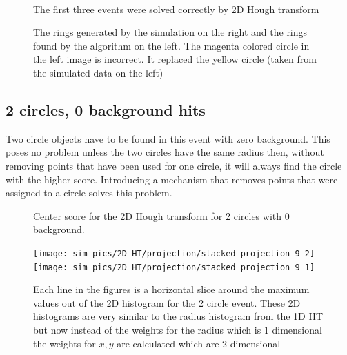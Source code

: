 \documentclass[11pt]{scrreprt}
\begin{document}
\begin{figure}[htp]
        \centering
        ~ %
        ~ %
              
        \caption{The first three events were solved correctly by 2D Hough transform}\label{fig:2D_HT_results1}

        \caption{The rings generated by the simulation on the right and the rings found by the algorithm on the left. The magenta 
        colored circle in the left image is incorrect. It replaced the yellow circle (taken from the simulated data on the left)}
        \label{fig:2d_6c_200_bg2}
\end{figure}


\subsection{2 circles, 0 background hits} %
\label{sub:2d_hough_transform_2_circles_0_background}
Two circle objects have to be found in this event with zero background. This
poses no problem unless the two circles have the same radius then, without
removing points that have been used for one circle, it will always find the 
circle with the higher score. Introducing a mechanism that removes points
that were assigned to a circle solves this problem.

\begin{figure}[htp]
        \centering
        \caption{Center score for the 2D Hough transform for 2 circles with 0 background.}\label{fig:2d_ht_center}

        \texttt{[image: sim\_pics/2D\_HT/projection/stacked\_projection\_9\_2]}%
        \texttt{[image: sim\_pics/2D\_HT/projection/stacked\_projection\_9\_1]}
        \caption[Two slices out of the 2D histogram]{Each line in the figures is a horizontal slice around the maximum values out
        of the 2D histogram for the 2 circle event. These 2D histograms are very similar to the radius histogram from the 1D HT but now instead of the weights for the radius which is 1 dimensional the 
        weights for $x,y$ are calculated which are 2 dimensional}\label{fig:2d_slices}
\end{figure}
\end{document}
